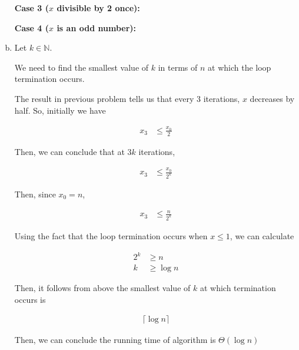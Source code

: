 \documentclass[12pt]{article}
\begin{document}
\begin{enumerate}[a.]
    \textbf{Case 3 ($x$ divisible by 2 once):}

    \bigskip

    \textbf{Case 4 ($x$ is an odd number):}

    \item

    Let $k \in \mathbb{N}$.

    \bigskip

    We need to find the smallest value of $k$ in terms of $n$ at which the loop
    termination occurs.

    \bigskip

    The result in previous problem tells us that every 3 iterations, $x$ decreases
    by half. So, initially we have

    \setcounter{equation}{0}
    \begin{align}
        x_3 &\leq \frac{x_0}{2}
    \end{align}

    \bigskip

    Then, we can conclude that at $3k$ iterations,

    \begin{align}
        x_3 &\leq \frac{x_0}{2^k}
    \end{align}

    \bigskip

    Then, since $x_0 = n$,

    \begin{align}
        x_3 &\leq \frac{n}{2^k}
    \end{align}

    \bigskip

    Using the fact that the loop termination occurs when $x \leq 1$, we can
    calculate

    \begin{align}
        2^k &\geq n\\
        k &\geq \log n
    \end{align}

    \bigskip

    Then, it follows from above the smallest value of $k$ at which termination occurs
    is

    \begin{align}
        \lceil \log n \rceil
    \end{align}

    \bigskip

    Then, we can conclude the running time of algorithm is $\Theta (\log n)$


\end{enumerate}
\end{document}
